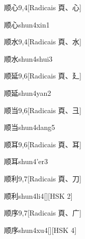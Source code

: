 \begin{entry}{顺心}{9,4}[Radicais ⾴、⼼]
  \begin{phonetics}{顺心}{shun4xin1}
  \end{phonetics}
\end{entry}

\begin{entry}{顺水}{9,4}[Radicais ⾴、⽔]
  \begin{phonetics}{顺水}{shun4shui3}
  \end{phonetics}
\end{entry}

\begin{entry}{顺延}{9,6}[Radicais ⾴、⼵]
  \begin{phonetics}{顺延}{shun4yan2}
  \end{phonetics}
\end{entry}

\begin{entry}{顺当}{9,6}[Radicais ⾴、⼹]
  \begin{phonetics}{顺当}{shun4dang5}
  \end{phonetics}
\end{entry}

\begin{entry}{顺耳}{9,6}[Radicais ⾴、⽿]
  \begin{phonetics}{顺耳}{shun4'er3}
  \end{phonetics}
\end{entry}

\begin{entry}{顺利}{9,7}[Radicais ⾴、⼑]
  \begin{phonetics}{顺利}{shun4li4}[][HSK 2]
  \end{phonetics}
\end{entry}

\begin{entry}{顺序}{9,7}[Radicais ⾴、⼴]
  \begin{phonetics}{顺序}{shun4xu4}[][HSK 4]
  \end{phonetics}
\end{entry}

